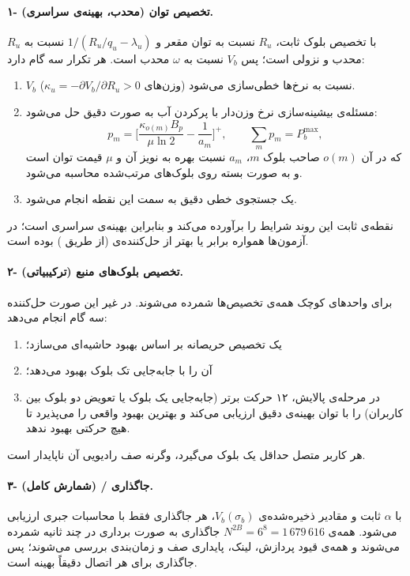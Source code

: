 \documentclass[12pt,oneside]{report}
\begin{document}
\paragraph{۱- تخصیص توان (محدب، بهینه‌ی سراسری).}
با تخصیص بلوک ثابت، $R_u$ نسبت به توان مقعر و $1/(R_u/q_u-\lambda_u)$ نسبت به $R_u$ محدب و نزولی است؛ پس $V_b$ نسبت به $\omega$ محدب است. هر تکرار سه گام دارد:
\begin{enumerate}
	\item $V_b$ نسبت به نرخ‌ها خطی‌سازی می‌شود (وزن‌های $\kappa_u=-\partial V_b/\partial R_u>0$).
	\item مسئله‌ی بیشینه‌سازی نرخ وزن‌دار با پرکردن آب به صورت دقیق حل می‌شود:
	\begin{equation}\label{eq:wf}
		p_m=\Big[\frac{\kappa_{o(m)}B_p}{\mu\ln2}-\frac{1}{a_m}\Big]^+,\qquad \sum_mp_m=P_b^{\max},
	\end{equation}
	که در آن $o(m)$ صاحب بلوک $m$، $a_m$ نسبت بهره به نویز آن و $\mu$ قیمت توان است و به صورت بسته روی بلوک‌های مرتب‌شده محاسبه می‌شود.
	\item یک جستجوی خطی دقیق به سمت این نقطه انجام می‌شود.
\end{enumerate}
نقطه‌ی ثابت این روند شرایط  را برآورده می‌کند و بنابراین بهینه‌ی سراسری است؛ در آزمون‌ها همواره برابر یا بهتر از حل‌کننده‌ی  (از طریق ) بوده است.

\paragraph{۲- تخصیص بلوک‌های منبع (ترکیبیاتی).}
برای واحدهای کوچک همه‌ی تخصیص‌ها شمرده می‌شوند. در غیر این صورت حل‌کننده سه گام انجام می‌دهد:
\begin{enumerate}
	\item یک تخصیص حریصانه بر اساس بهبود حاشیه‌ای می‌سازد؛
	\item آن را با جابه‌جایی تک بلوک بهبود می‌دهد؛
	\item در مرحله‌ی پالایش، ۱۲ حرکت برتر (جابه‌جایی یک بلوک یا تعویض دو بلوک بین کاربران) را با توان بهینه‌ی دقیق ارزیابی می‌کند و بهترین بهبود واقعی را می‌پذیرد تا هیچ حرکتی بهبود ندهد.
\end{enumerate}
هر کاربر متصل حداقل یک بلوک می‌گیرد، وگرنه صف رادیویی آن ناپایدار است.

\paragraph{۳- جاگذاری / (شمارش کامل).}
با $\alpha$ ثابت و مقادیر ذخیره‌شده‌ی $V_b(\sigma_b)$، هر جاگذاری فقط با محاسبات جبری ارزیابی می‌شود. همه‌ی $N^{2B}=6^8=1\,679\,616$ جاگذاری به صورت برداری در چند ثانیه شمرده می‌شوند و همه‌ی قیود پردازش، لینک، پایداری صف و زمان‌بندی بررسی می‌شوند؛ پس جاگذاری برای هر اتصال دقیقاً بهینه است.
\end{document}
